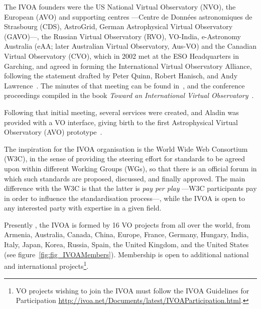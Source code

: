 		 The IVOA founders were the US National Virtual Observatory
		(NVO), the European (AVO) and supporting centres ---Centre
		de Données astronomiques de Strasbourg (CDS), AstroGrid,
		German Astrophysical Virtual Observatory (GAVO)---, the
		Russian Virtual Observatory (RVO), VO-India, e-Astronomy
		Australia (eAA; later Australian Virtual Observatory,
		Aus-VO) and the Canadian Virtual Observatory (CVO), which
		in 2002 met at the ESO Headquarters in Garching, and agreed
		in forming the International Virtual Observatory Alliance,
		following the statement drafted by Peter Quinn, Robert
		Hanisch, and Andy Lawrence~\cite{Quinn:2002qf}. The minutes
		of that meeting can be found in~\cite{deYoung:2002rt},
		and the conference proceedings compiled in the book
		\emph{Toward an International Virtual
		Observatory}~\cite{2004tivo.conf.....Q}.
		
		 Following that initial meeting, several services were
		created, and Aladin was provided with a VO interface,
		giving birth to the first Astrophysical Virtual Observatory
		(AVO) prototype~\cite{2004ASPC..314..304Q}.
		
		 The inspiration for the IVOA organisation is the World
		Wide Web Consortium (W3C), in the
		sense of providing the steering effort for standards to be
		agreed upon within different Working Groups (WGs), so that
		there is an official forum in which such standards are
		proposed, discussed, and finally approved. The main
		difference with the W3C is that the latter is \emph{pay per
		play} ---W3C participants pay in order to influence the
		standardisation process---, while the IVOA is open to any
		interested party with expertise in a given field.
		
		Presently , the IVOA is
		formed by 16 VO projects from all over the
		world, from Armenia,
		Australia, Canada, China, Europe, France, Germany, Hungary,
		India, Italy, Japan, Korea, Russia, Spain, the United Kingdom,
		and the United States (see figure~\ref{fig:fig_IVOAMembers}).
		Membership is open to additional national and international
		projects\footnote{
			VO projects wishing to join the IVOA must
			follow the IVOA Guidelines for Participation
		\url{http://ivoa.net/Documents/latest/IVOAParticipation.html}.
		}.

